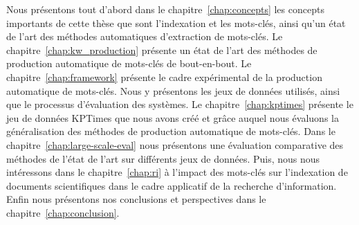 Nous présentons tout d'abord dans le chapitre~\ref{chap:concepts} les concepts importants de cette thèse que sont l'indexation et les mots-clés, ainsi qu'un état de l'art des méthodes automatiques d'extraction de mots-clés.
Le chapitre~\ref{chap:kw_production} présente un état de l'art des méthodes de production automatique de mots-clés de bout-en-bout.
Le chapitre~\ref{chap:framework} présente le cadre expérimental de la production automatique de mots-clés. Nous y présentons les jeux de données utilisés, ainsi que le processus d'évaluation des systèmes.
Le chapitre~\ref{chap:kptimes} présente le jeu de données KPTimes que nous avons créé et grâce auquel nous évaluons la généralisation des méthodes de production automatique de mots-clés.
Dans le chapitre~\ref{chap:large-scale-eval} nous présentons une évaluation comparative des méthodes de l'état de l'art sur différents jeux de données.
Puis, nous nous intéressons dans le chapitre~\ref{chap:ri} à l'impact des mots-clés sur l'indexation de documents scientifiques dans le cadre applicatif de la recherche d'information.
Enfin nous présentons nos conclusions et perspectives dans le chapitre~\ref{chap:conclusion}.







